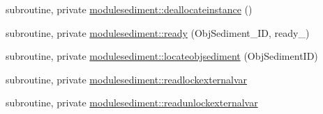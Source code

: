 \begin{DoxyCompactItemize}
\item 
subroutine, private \mbox{\hyperlink{namespacemodulesediment_aaca3b711a9cb64af8d2ec951a1338ddd}{modulesediment\+::deallocateinstance}} ()
\item 
subroutine, private \mbox{\hyperlink{namespacemodulesediment_a2427e7af36c908526797cc897f1dca07}{modulesediment\+::ready}} (Obj\+Sediment\+\_\+\+ID, ready\+\_\+)
\item 
subroutine, private \mbox{\hyperlink{namespacemodulesediment_a3719cfe21de51d5aff6e236bffdbe06d}{modulesediment\+::locateobjsediment}} (Obj\+Sediment\+ID)
\item 
subroutine, private \mbox{\hyperlink{namespacemodulesediment_a94b876e44c6f435015c969c6a2f32978}{modulesediment\+::readlockexternalvar}}
\item 
subroutine, private \mbox{\hyperlink{namespacemodulesediment_a8c3164236748ba94c8bef14c5dd430b9}{modulesediment\+::readunlockexternalvar}}
\end{DoxyCompactItemize}
